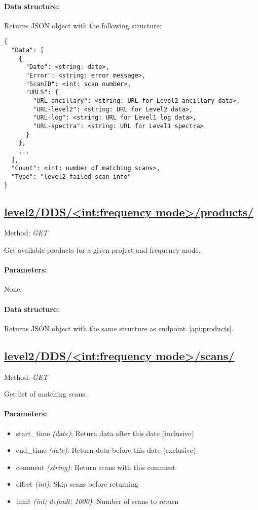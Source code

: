 \paragraph{Data structure:}
Returns JSON object with the following structure:

\begin{lstlisting}[basicstyle=\footnotesize]
{
  "Data": [
    {
      "Date": <string: date>,
      "Error": <string: error message>,
      "ScanID": <int: scan number>,
      "URLS": {
        "URL-ancillary": <string: URL for Level2 ancillary data>,
        "URL-level2": <string: URL for Level2 data>,
        "URL-log": <string: URL for Level1 log data>,
        "URL-spectra": <string: URL for Level1 spectra>
      }
    },
    ...
  ],
  "Count": <int: number of matching scans>,
  "Type": "level2_failed_scan_info"
}
\end{lstlisting}


\subsection{\url{level2/DDS/<int:frequency mode>/products/}}
Method: \emph{GET}

Get available products for a given project and frequency mode.

\paragraph{Parameters:} None.

\paragraph{Data structure:}
Returns JSON object with the same structure as endpoint~\ref{api:products}.


\subsection{\url{level2/DDS/<int:frequency mode>/scans/}}
Method: \emph{GET}

Get list of matching scans.

\paragraph{Parameters:}
\begin{itemize}
    \item start\_time \emph{(date)}: Return data after this date (inclusive)
    \item end\_time \emph{(date)}: Return data before this date (exclusive)
    \item comment \emph{(string)}: Return scans with this comment
    \item offset \emph{(int)}: Skip scans before returning
    \item limit \emph{(int; default: 1000)}: Number of scans to return
\end{itemize}


